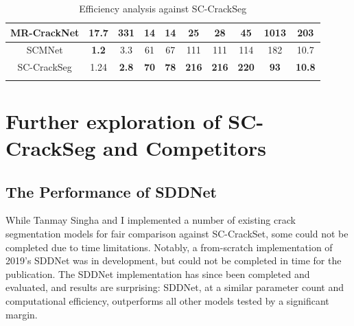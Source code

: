 \documentclass[a4paper,12pt]{report}
\begin{document}
\begin{table}
\begin{adjustbox}{width=\columnwidth,center}
\begin{tabular}{|c|c|c|c|c|c|c|c|c|c|}
            \hline
            {MR-CrackNet} & {17.7}       & {331}        & {14}                                                           & {14}        & {25}         & {28}         & {45}         & {1013}                                                   & {203}         \\
            \hline
            {SCMNet}      & \textbf{1.2} & {3.3}        & {61}                                                           & {67}        & {111}        & {111}        & {114}        & {182}                                                    & {10.7}        \\
            \hline
            {SC-CrackSeg} & {1.24}       & \textbf{2.8} & \textbf{70}                                                    & \textbf{78} & \textbf{216} & \textbf{216} & \textbf{220} & \textbf{93}                                              & \textbf{10.8} \\
            \hline
            \multicolumn{10}{l}{}
        \end{tabular}
    \end{adjustbox}
    \caption{Efficiency analysis against SC-CrackSeg}
    \label{tab:sc-crackseg-initial-efficiency-comparison}
\end{table}


\section{Further exploration of SC-CrackSeg and Competitors}
\subsection{The Performance of SDDNet}
While Tanmay Singha and I implemented a number of existing crack segmentation models for fair comparison against SC-CrackSet, some could not be completed due to time limitations. Notably, a from-scratch implementation of 2019's SDDNet \cite{choi_sddnet_2019} was in development, but could not be completed in time for the publication. The SDDNet implementation has since been completed and evaluated, and results are surprising: SDDNet, at a similar parameter count and computational efficiency, outperforms all other models tested by a significant margin.
\end{document}
